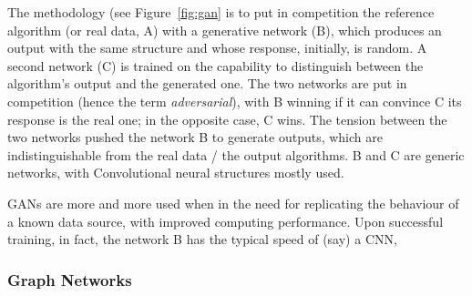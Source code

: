 The methodology (see Figure~\ref{fig:gan} is to put in competition the reference algorithm (or real data, A) with a generative network (B), which produces an output with the same structure and whose response, initially, is random. A second network (C) is trained on the capability to distinguish between the algorithm's output and the generated one. The two networks are put in competition (hence the term \emph{adversarial}), with B winning if it can convince C its response is the real one; in the opposite case, C wins.
The tension between the two networks pushed the network B to generate outputs, which are indistinguishable from the real data / the output algorithms. B and C are generic networks, with Convolutional neural structures mostly used.

GANs are more and more used when in the need for replicating the behaviour of a known data source, with improved computing performance. Upon successful training, in fact, the network B has the typical speed of (say) a CNN, 

\subsubsection{Graph Networks}




